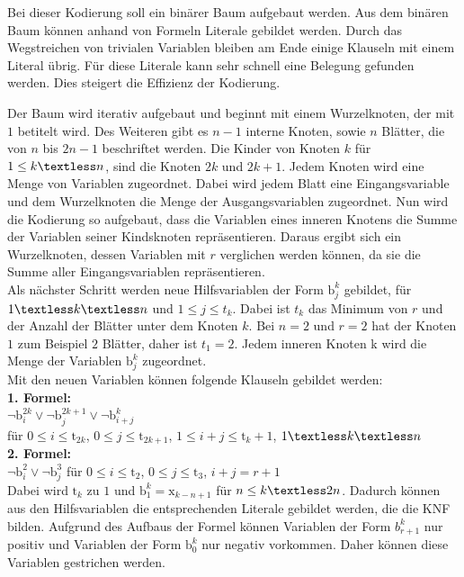 \documentclass[a4,abstract=on]{scrartcl}
\begin{document}
Bei dieser Kodierung soll ein binärer Baum aufgebaut werden. Aus dem binären Baum können anhand von Formeln Literale gebildet werden. Durch das Wegstreichen von trivialen Variablen bleiben am Ende einige Klauseln mit einem Literal übrig. Für diese Literale kann sehr schnell eine Belegung gefunden werden. Dies steigert die Effizienz der Kodierung.

Der Baum wird iterativ aufgebaut und beginnt mit einem Wurzelknoten, der mit $1$ betitelt wird. Des Weiteren gibt es $n-1$ interne Knoten, sowie $n$ Blätter, die von $n$ bis $2n-1$ beschriftet werden. Die Kinder von Knoten $k$  für $1 \leq k \textless n$, sind die Knoten $2k$ und $2k +1$.
Jedem Knoten wird eine Menge von Variablen zugeordnet. Dabei wird jedem Blatt eine Eingangsvariable und dem Wurzelknoten die Menge der Ausgangsvariablen zugeordnet. Nun wird die Kodierung so aufgebaut, dass die Variablen eines inneren Knotens die Summe der Variablen seiner Kindsknoten repräsentieren. Daraus ergibt sich ein Wurzelknoten, dessen Variablen mit $r$ verglichen werden können, da sie die Summe aller Eingangsvariablen repräsentieren.\\

Als nächster Schritt werden neue Hilfsvariablen der Form $\text{b}_j^k$ gebildet, für $1 \textless k \textless n$ und  $1 \leq j \leq t_k$. Dabei ist $t_k$ das Minimum von $r$ und der Anzahl der Blätter unter dem Knoten $k$. Bei $n=2$ und $r=2$ hat der Knoten $1$ zum Beispiel $2$ Blätter, daher ist $t_1=2$. Jedem inneren Knoten k wird die Menge der Variablen $\text{b}_j^k$ zugeordnet.\\
Mit den neuen Variablen können folgende Klauseln gebildet werden:\\
\textbf{1. Formel:}\\
$ \neg \text{b}_i^{2k} \vee \neg \text{b}_j^{2k+1} \vee \neg \text{b}_{i+j}^{k}$ \\
für $0\leq i \leq \text{t}_{2k}$, $0\leq j \leq \text{t}_{2k+1}$, $1\leq i+j \leq \text{t}_{k}+1$, $1\textless k \textless n$\\
\textbf{2. Formel:}\\
$ \neg \text{b}_i^2 \vee \neg \text{b}_j^3$ für $0\leq i \leq \text{t}_2$, $0\leq j \leq \text{t}_3$, $i+j = r+1$\\

Dabei wird $\text{t}_k$ zu $1$ und $\text{b}_1^k = \text{x}_{k-n+1}$ für $n \leq k \textless 2n$. Dadurch können aus den Hilfsvariablen die entsprechenden Literale gebildet werden, die die KNF bilden.
Aufgrund des Aufbaus der Formel können Variablen der Form $b_{r+1}^k$ nur positiv und Variablen der Form $\text{b}_0^k$ nur negativ vorkommen. Daher können diese Variablen gestrichen werden.
\end{document}
